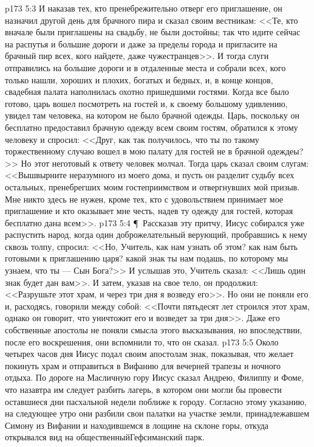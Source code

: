 \vs p173 5:3 И наказав тех, кто пренебрежительно отверг его приглашение, он назначил другой день для брачного пира и сказал своим вестникам: <<Те, кто вначале были приглашены на свадьбу, не были достойны; так что идите сейчас на распутья и большие дороги и даже за пределы города и пригласите на брачный пир всех, кого найдете, даже чужестранцев>>. И тогда слуги отправились на большие дороги и в отдаленные места и собрали всех, кого только нашли, хороших и плохих, богатых и бедных, и, в конце концов, свадебная палата наполнилась охотно пришедшими гостями. Когда все было готово, царь вошел посмотреть на гостей и, к своему большому удивлению, увидел там человека, на котором не было брачной одежды. Царь, поскольку он бесплатно предоставил брачную одежду всем своим гостям, обратился к этому человеку и спросил: <<Друг, как так получилось, что ты по такому торжественному случаю вошел в мою палату для гостей не в брачной одеждеы?>> Но этот неготовый к ответу человек молчал. Тогда царь сказал своим слугам: <<Вышвырните неразумного из моего дома, и пусть он разделит судьбу всех остальных, пренебрегших моим гостеприимством и отвергнувших мой призыв. Мне никто здесь не нужен, кроме тех, кто с удовольствием принимает мое приглашение и кто оказывает мне честь, надев ту одежду для гостей, которая бесплатно дана всем>>.
\vs p173 5:4 \P\ Рассказав эту притчу, Иисус собирался уже распустить народ, когда один доброжелательный верующий, пробравшись к нему сквозь толпу, спросил: <<Но, Учитель, как нам узнать об этом? как нам быть готовыми к приглашению царя? какой знак ты нам подашь, по которому мы узнаем, что ты --- Сын Бога?>> И услышав это, Учитель сказал: <<Лишь один знак будет дан вам>>. И затем, указав на свое тело, он продолжил: <<Разрушьте этот храм, и через три дня я возведу его>>. Но они не поняли его и, расходясь, говорили между собой: <<Почти пятьдесят лет строился этот храм, однако он говорит, что уничтожит его и возведет за три дня>>. Даже его собственные апостолы не поняли смысла этого высказывания, но впоследствии, после его воскрешения, они вспомнили то, что он сказал.
\vs p173 5:5 Около четырех часов дня Иисус подал своим апостолам знак, показывая, что желает покинуть храм и отправиться в Вифанию для вечерней трапезы и ночного отдыха. По дороге на Масличную гору Иисус сказал Андрею, Филиппу и Фоме, что назавтра им следует разбить лагерь, в котором они могли бы провести оставшиеся дни пасхальной недели поближе к городу. Согласно этому указанию, на следующее утро они разбили свои палатки на участке земли, принадлежавшем Симону из Вифании и находившемся в лощине на склоне горы, откуда открывался вид на общественныйГефсиманский парк.
